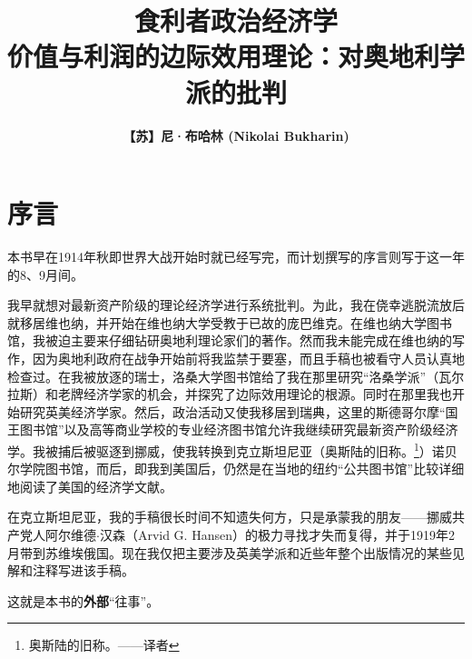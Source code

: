 \documentclass[fontset=fandol, a4paper, 12pt, openright]{ctexbook}
\title{\Huge \textbf{食利者政治经济学}\\ \Large 价值与利润的边际效用理论：对奥地利学派的批判}
\author{\textbf{【苏】尼·布哈林 (Nikolai Bukharin)}}
\date{}
\begin{document}
\frontmatter

\maketitle


\tableofcontents



\chapter*{序言}

本书早在1914年秋即世界大战开始时就已经写完，而计划撰写的序言则写于这一年的8、9月间。

我早就想对最新资产阶级的理论经济学进行系统批判。为此，我在侥幸逃脱流放后就移居维也纳，并开始在维也纳大学受教于已故的庞巴维克。在维也纳大学图书馆，我被迫主要来仔细钻研奥地利理论家们的著作。然而我未能完成在维也纳的写作，因为奥地利政府在战争开始前将我监禁于要塞，而且手稿也被看守人员认真地检查过。在我被放逐的瑞士，洛桑大学图书馆给了我在那里研究“洛桑学派”（瓦尔拉斯）和老牌经济学家的机会，并探究了边际效用理论的根源。同时在那里我也开始研究英美经济学家。然后，政治活动又使我移居到瑞典，这里的斯德哥尔摩“国王图书馆”以及高等商业学校的专业经济图书馆允许我继续研究最新资产阶级经济学。我被捕后被驱逐到挪威，使我转换到克立斯坦尼亚（奥斯陆的旧称。\footnote{奥斯陆的旧称。——译者}）诺贝尔学院图书馆，而后，即我到美国后，仍然是在当地的纽约“公共图书馆”比较详细地阅读了美国的经济学文献。

在克立斯坦尼亚，我的手稿很长时间不知遗失何方，只是承蒙我的朋友——挪威共产党人阿尔维德$\cdot$汉森（Arvid G. Hansen）的极力寻找才失而复得，并于1919年2月带到苏维埃俄国。现在我仅把主要涉及英美学派和近些年整个出版情况的某些见解和注释写进该手稿。

这就是本书的\textbf{外部}“往事”。
\end{document}
